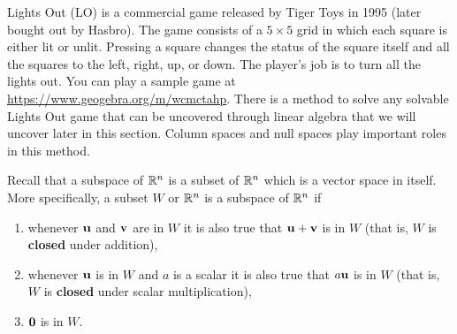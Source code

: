  \label{chap:null_space}

\vspace*{-17 pt}

\vspace*{13 pt}

\label{sec:appl_lights_out}

Lights Out (LO) is a commercial game released by Tiger Toys in 1995 (later bought out by Hasbro). The game consists of a $5 \times 5$ grid in which each square is either lit or unlit. Pressing a square changes the status of the square itself and all the squares to the left, right, up, or down. The player's job is to turn all the lights out. You can play a sample game at \url{https://www.geogebra.org/m/wcmctahp}. There is a method to solve any solvable Lights Out game that can be uncovered through linear algebra that we will uncover later in this section. Column spaces and null spaces play important roles in this method. 

\label{sec:null_intro}

Recall that a subspace of $\mathbb{R}^n$ is a subset of $\mathbb{R}^n$ which is a vector space in itself. More specifically, a subset $W$ or $\mathbb{R}^n$ is a subspace of $\mathbb{R}^n$ if 
\begin{enumerate}
\item whenever $\mathbf{u}$ and $\mathbf{v}$ are in $W$ it is also true that $\mathbf{u} + \mathbf{v}$ is in $W$ (that is, $W$ is \textbf{closed} under addition),
\item whenever $\mathbf{u}$ is in $W$ and $a$ is a scalar it is also true that $a\mathbf{u}$ is in $W$ (that is, $W$ is \textbf{closed} under scalar multiplication),
\item $\mathbf{0}$ is in $W$.
\end{enumerate}

